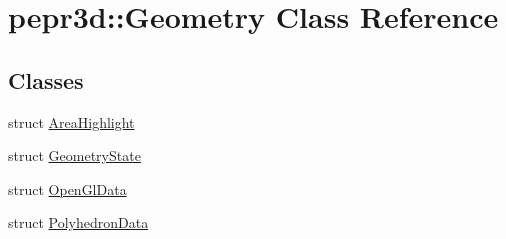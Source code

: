 \hypertarget{classpepr3d_1_1_geometry}{}\section{pepr3d\+::Geometry Class Reference}
\label{classpepr3d_1_1_geometry}
\subsection*{Classes}
\begin{DoxyCompactItemize}
\item 
struct \mbox{\hyperlink{structpepr3d_1_1_geometry_1_1_area_highlight}{Area\+Highlight}}
\item 
struct \mbox{\hyperlink{structpepr3d_1_1_geometry_1_1_geometry_state}{Geometry\+State}}
\item 
struct \mbox{\hyperlink{structpepr3d_1_1_geometry_1_1_open_gl_data}{Open\+Gl\+Data}}
\item 
struct \mbox{\hyperlink{structpepr3d_1_1_geometry_1_1_polyhedron_data}{Polyhedron\+Data}}
\end{DoxyCompactItemize}
